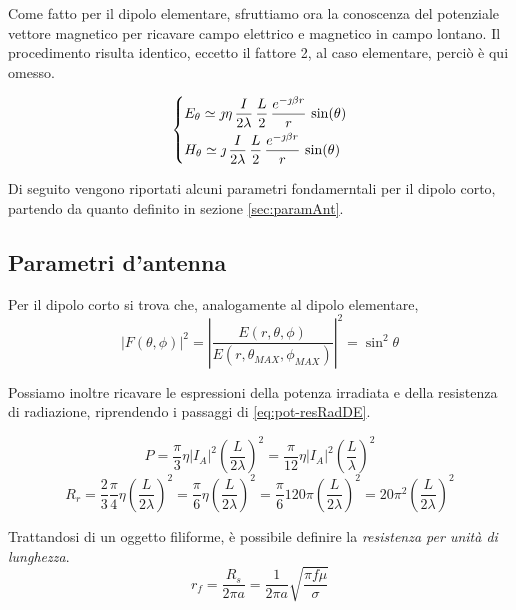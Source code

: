 \bigbreak
Come fatto per il dipolo elementare, sfruttiamo ora la conoscenza del potenziale vettore magnetico per ricavare campo elettrico e magnetico in campo lontano.
Il procedimento risulta identico, eccetto il fattore 2, al caso elementare, perciò è qui omesso.

\begin{equation}\begin{dcases}
	E_\theta
	\simeq \jmath \eta\,\frac{I}{2\lambda}\, \frac{L}{2} \, \frac{e^{-\jmath \beta r}}{r} \, \sin(\theta) \\
	H_\theta
	\simeq \jmath \,\frac{I}{2\lambda}\, \frac{L}{2} \, \frac{e^{-\jmath \beta r}}{r} \, \sin(\theta) \\
\end{dcases}\end{equation}

Di seguito vengono riportati alcuni parametri fondamerntali per il dipolo corto, partendo da quanto definito in sezione \ref{sec:paramAnt}.

\subsection{Parametri d'antenna}

Per il dipolo corto si trova che, analogamente al dipolo elementare,
\begin{equation}
\left | F(\theta, \phi) \right |^2 = \left | \frac{E(r, \theta, \phi)}{E(r, \theta_{MAX}, \phi_{MAX})} \right |^2 = \sin^2\theta
\end{equation}

Possiamo inoltre ricavare le espressioni della potenza irradiata e della resistenza di radiazione, riprendendo i passaggi di \autoref{eq:pot-resRadDE}.

\begin{equation*}
P = \frac{\pi}{3} \eta \left | I_A \right |^2 \left(\frac{L}{2 \lambda}\right)^2 = \frac{\pi}{12} \eta \left | I_A \right |^2 \left(\frac{L}{\lambda}\right)^2
\end{equation*}
\begin{equation*}
R_r = \frac{2}{3} \frac{\pi}{4} \eta \left(\frac{L}{2 \lambda}\right)^2 = \frac{\pi}{6} \eta \left(\frac{L}{2 \lambda}\right)^2 = \frac{\pi}{6} 120 \pi	 \left(\frac{L}{2 \lambda}\right)^2 = 20 \pi^2 \left(\frac{L}{2 \lambda}\right)^2
\end{equation*}

Trattandosi di un oggetto filiforme, è possibile definire la \emph{resistenza per unità di lunghezza}.
\begin{equation*}
			r_f = \frac{R_s}{2 \pi a} = \frac{1}{2 \pi a} \sqrt{\frac{\pi f \mu }{\sigma}}
		\end{equation*}

